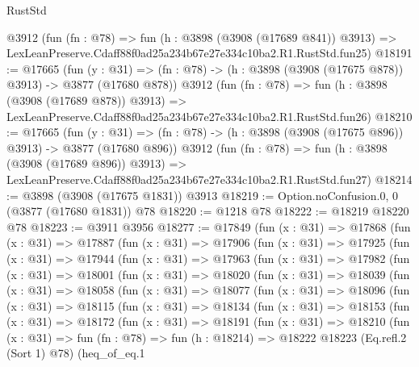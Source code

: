 \begin{lexlean}{RustStd}
\begin{coremodule}
    @3912
    (fun (fn : @78) =>
    fun (h : @3898 (@3908 (@17689 @841)) @3913) =>
    LexLeanPreserve.Cdaff88f0ad25a234b67e27e334c10ba2.R1.RustStd.fun25)
@18191 := @17665
    (fun (y : @31) => (fn : @78) -> (h : @3898 (@3908 (@17675 @878)) @3913) -> @3877 (@17680 @878))
    @3912
    (fun (fn : @78) =>
    fun (h : @3898 (@3908 (@17689 @878)) @3913) =>
    LexLeanPreserve.Cdaff88f0ad25a234b67e27e334c10ba2.R1.RustStd.fun26)
@18210 := @17665
    (fun (y : @31) => (fn : @78) -> (h : @3898 (@3908 (@17675 @896)) @3913) -> @3877 (@17680 @896))
    @3912
    (fun (fn : @78) =>
    fun (h : @3898 (@3908 (@17689 @896)) @3913) =>
    LexLeanPreserve.Cdaff88f0ad25a234b67e27e334c10ba2.R1.RustStd.fun27)
@18214 := @3898 (@3908 (@17675 @1831)) @3913
@18219 := Option.noConfusion.{0, 0} (@3877 (@17680 @1831)) @78
@18220 := @1218 @78
@18222 := @18219 @18220 @78
@18223 := @3911 @3956
@18277 := @17849
    (fun (x : @31) =>
    @17868
      (fun (x : @31) =>
      @17887
        (fun (x : @31) =>
        @17906
          (fun (x : @31) =>
          @17925
            (fun (x : @31) =>
            @17944
              (fun (x : @31) =>
              @17963
                (fun (x : @31) =>
                @17982
                  (fun (x : @31) =>
                  @18001
                    (fun (x : @31) =>
                    @18020
                      (fun (x : @31) =>
                      @18039
                        (fun (x : @31) =>
                        @18058
                          (fun (x : @31) =>
                          @18077
                            (fun (x : @31) =>
                            @18096
                              (fun (x : @31) =>
                              @18115
                                (fun (x : @31) =>
                                @18134
                                  (fun (x : @31) =>
                                  @18153
                                    (fun (x : @31) =>
                                    @18172
                                      (fun (x : @31) =>
                                      @18191
                                        (fun (x : @31) =>
                                        @18210
                                          (fun (x : @31) =>
                                          fun (fn : @78) =>
                                          fun (h : @18214) =>
                                          @18222
                                            @18223
                                            (Eq.refl.{2} (Sort 1) @78)
                                            (heq_of_eq.{1}

\end{coremodule}
\end{lexlean}
